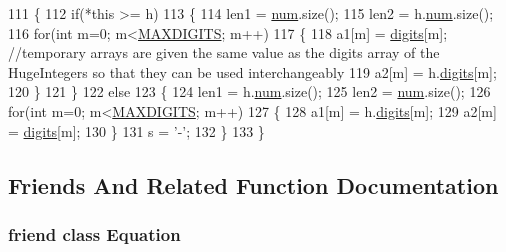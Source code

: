 \begin{DoxyCode}
111 \{
112    \textcolor{keywordflow}{if}(*\textcolor{keyword}{this} >= h)
113    \{
114       len1 = \hyperlink{classHugeInteger_a3d21e9f761dfb49fb6559389685af830}{num}.size();
115       len2 = h.\hyperlink{classHugeInteger_a3d21e9f761dfb49fb6559389685af830}{num}.size();
116       \textcolor{keywordflow}{for}(\textcolor{keywordtype}{int} m=0; m<\hyperlink{classHugeInteger_a35ff958aa09161b192b69b1de876dab3}{MAXDIGITS}; m++)
117       \{
118          a1[m] = \hyperlink{classHugeInteger_ab0bd42ce92321df91e3a9a11897cdb8a}{digits}[m]; \textcolor{comment}{//temporary arrays are given the same value as the digits array of the
       HugeIntegers so that they can be used interchangeably                                                    }
119          a2[m] = h.\hyperlink{classHugeInteger_ab0bd42ce92321df91e3a9a11897cdb8a}{digits}[m];
120       \}
121    \}
122    \textcolor{keywordflow}{else}
123    \{
124       len1 = h.\hyperlink{classHugeInteger_a3d21e9f761dfb49fb6559389685af830}{num}.size();
125       len2 = \hyperlink{classHugeInteger_a3d21e9f761dfb49fb6559389685af830}{num}.size();
126       \textcolor{keywordflow}{for}(\textcolor{keywordtype}{int} m=0; m<\hyperlink{classHugeInteger_a35ff958aa09161b192b69b1de876dab3}{MAXDIGITS}; m++)
127       \{
128          a1[m] = h.\hyperlink{classHugeInteger_ab0bd42ce92321df91e3a9a11897cdb8a}{digits}[m];
129          a2[m] = \hyperlink{classHugeInteger_ab0bd42ce92321df91e3a9a11897cdb8a}{digits}[m];
130       \}
131       s = \textcolor{charliteral}{'-'};
132    \}
133 \}
\end{DoxyCode}


\subsection{Friends And Related Function Documentation}
\subsubsection[{\texorpdfstring{Equation}{Equation}}]{\setlength{\rightskip}{0pt plus 5cm}friend class Equation\hspace{0.3cm}{\ttfamily [friend]}}\hypertarget{classHugeInteger_a9bfba8577640e06376146eaf7da56aae}{}\label{classHugeInteger_a9bfba8577640e06376146eaf7da56aae}

